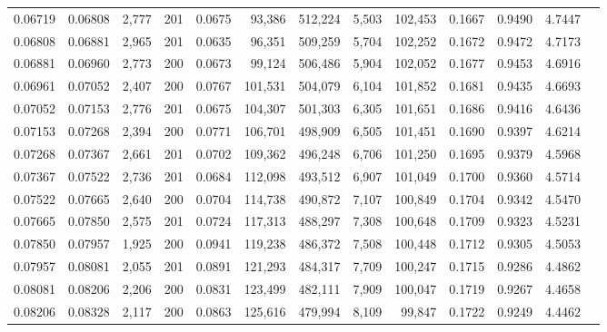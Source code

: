 \begin{tabular}{rrrrrrrrrrrrr}
0.06719 & 0.06808 & 2,777 & 201 &                                     0.0675 &  93,386 & 512,224 &   5,503 & 102,453 & 0.1667 & 0.9490 & 4.7447 \\
0.06808 & 0.06881 & 2,965 & 201 &                                     0.0635 &  96,351 & 509,259 &   5,704 & 102,252 & 0.1672 & 0.9472 & 4.7173 \\
0.06881 & 0.06960 & 2,773 & 200 &                                     0.0673 &  99,124 & 506,486 &   5,904 & 102,052 & 0.1677 & 0.9453 & 4.6916 \\
0.06961 & 0.07052 & 2,407 & 200 &                                     0.0767 & 101,531 & 504,079 &   6,104 & 101,852 & 0.1681 & 0.9435 & 4.6693 \\
0.07052 & 0.07153 & 2,776 & 201 &                                     0.0675 & 104,307 & 501,303 &   6,305 & 101,651 & 0.1686 & 0.9416 & 4.6436 \\
0.07153 & 0.07268 & 2,394 & 200 &                                     0.0771 & 106,701 & 498,909 &   6,505 & 101,451 & 0.1690 & 0.9397 & 4.6214 \\
0.07268 & 0.07367 & 2,661 & 201 &                                     0.0702 & 109,362 & 496,248 &   6,706 & 101,250 & 0.1695 & 0.9379 & 4.5968 \\
0.07367 & 0.07522 & 2,736 & 201 &                                     0.0684 & 112,098 & 493,512 &   6,907 & 101,049 & 0.1700 & 0.9360 & 4.5714 \\
0.07522 & 0.07665 & 2,640 & 200 &                                     0.0704 & 114,738 & 490,872 &   7,107 & 100,849 & 0.1704 & 0.9342 & 4.5470 \\
0.07665 & 0.07850 & 2,575 & 201 &                                     0.0724 & 117,313 & 488,297 &   7,308 & 100,648 & 0.1709 & 0.9323 & 4.5231 \\
0.07850 & 0.07957 & 1,925 & 200 &                                     0.0941 & 119,238 & 486,372 &   7,508 & 100,448 & 0.1712 & 0.9305 & 4.5053 \\
0.07957 & 0.08081 & 2,055 & 201 &                                     0.0891 & 121,293 & 484,317 &   7,709 & 100,247 & 0.1715 & 0.9286 & 4.4862 \\
0.08081 & 0.08206 & 2,206 & 200 &                                     0.0831 & 123,499 & 482,111 &   7,909 & 100,047 & 0.1719 & 0.9267 & 4.4658 \\
0.08206 & 0.08328 & 2,117 & 200 &                                     0.0863 & 125,616 & 479,994 &   8,109 &  99,847 & 0.1722 & 0.9249 & 4.4462 \\

\end{tabular}
